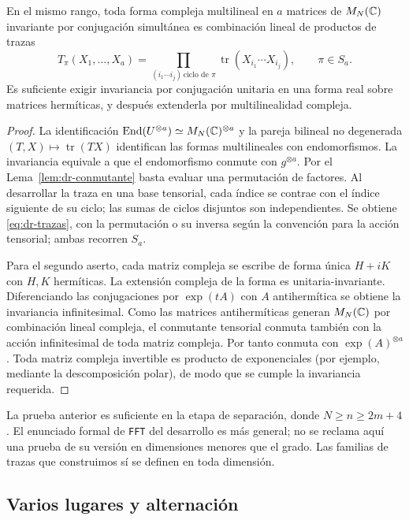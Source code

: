 \begin{proposicion}
\label{prop:dr-fft}
En el mismo rango, toda forma compleja multilineal en $a$ matrices de $M_N(\mathbb{C})$ invariante por conjugación simultánea es combinación lineal de productos de trazas
\begin{equation}
 T_\pi(X_1,\ldots,X_a)=\prod_{(i_1\cdots i_j)\,\text{ciclo de }\pi}
       \operatorname{tr}(X_{i_1}\cdots X_{i_j}),\qquad \pi\in S_a.
 \label{eq:dr-trazas}
\end{equation}
Es suficiente exigir invariancia por conjugación unitaria en una forma real sobre matrices hermíticas, y después extenderla por multilinealidad compleja.
\end{proposicion}
\begin{proof}
La identificación $\operatorname{End}(U^{\otimes a})\simeq M_N(\mathbb{C})^{\otimes a}$ y la pareja bilineal no degenerada $(T,X)\mapsto\operatorname{tr}(TX)$ identifican las formas multilineales con endomorfismos. La invariancia equivale a que el endomorfismo conmute con $g^{\otimes a}$. Por el Lema~\ref{lem:dr-conmutante} basta evaluar una permutación de factores. Al desarrollar la traza en una base tensorial, cada índice se contrae con el índice siguiente de su ciclo; las sumas de ciclos disjuntos son independientes. Se obtiene \eqref{eq:dr-trazas}, con la permutación o su inversa según la convención para la acción tensorial; ambas recorren $S_a$.

Para el segundo aserto, cada matriz compleja se escribe de forma única $H+iK$ con $H,K$ hermíticas. La extensión compleja de la forma es unitaria-invariante. Diferenciando las conjugaciones por $\exp(tA)$ con $A$ antihermítica se obtiene la invariancia infinitesimal. Como las matrices antihermíticas generan $M_N(\mathbb{C})$ por combinación lineal compleja, el conmutante tensorial conmuta también con la acción infinitesimal de toda matriz compleja. Por tanto conmuta con $\exp(A)^{\otimes a}$. Toda matriz compleja invertible es producto de exponenciales (por ejemplo, mediante la descomposición polar), de modo que se cumple la invariancia requerida.
\end{proof}

La prueba anterior es suficiente en la etapa de separación, donde $N\ge n\ge2m+4$. El enunciado formal de \texttt{FFT} del desarrollo es más general; no se reclama aquí una prueba de su versión en dimensiones menores que el grado. Las familias de trazas que construimos sí se definen en toda dimensión.

\subsection{Varios lugares y alternación}

